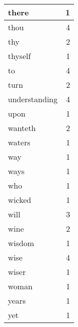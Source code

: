 \begin{center}
\begin{longtable}{l|r}
there & 1\\ \hline 
thou & 4\\ \hline 
thy & 2\\ \hline 
thyself & 1\\ \hline 
to & 4\\ \hline 
turn & 2\\ \hline 
understanding & 4\\ \hline 
upon & 1\\ \hline 
wanteth & 2\\ \hline 
waters & 1\\ \hline 
way & 1\\ \hline 
ways & 1\\ \hline 
who & 1\\ \hline 
wicked & 1\\ \hline 
will & 3\\ \hline 
wine & 2\\ \hline 
wisdom & 1\\ \hline 
wise & 4\\ \hline 
wiser & 1\\ \hline 
woman & 1\\ \hline 
years & 1\\ \hline 
yet & 1\\ \hline 
\end{longtable}  
\end{center}  


  
\normalsize  

  
  
